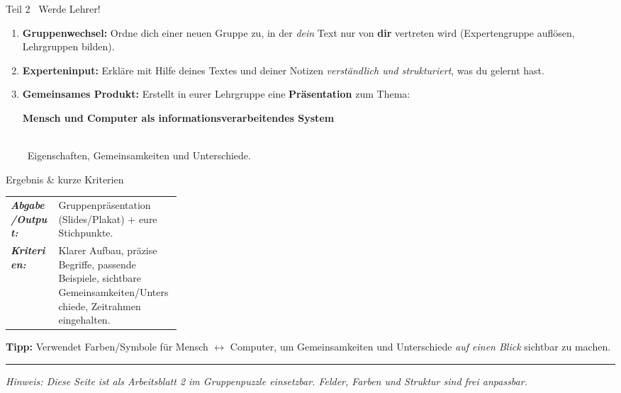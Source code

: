 \documentclass[11pt,a4paper]{scrartcl}
\newcommand{\blatttyp}{Arbeitsblatt 2}
\begin{document}
\begin{teilbox}{Teil 2 \textemdash\ Werde Lehrer!}
\begin{enumerate}[label=\roman*)]
  \item \textbf{Gruppenwechsel:} Ordne dich einer neuen Gruppe zu, in der \emph{dein} Text nur von \textbf{dir} vertreten wird (Expertengruppe auflösen, Lehrgruppen bilden).
  \item \textbf{Experteninput:} Erkläre mit Hilfe deines Textes und deiner Notizen \emph{verständlich und strukturiert}, was du gelernt hast. \\
  \item \textbf{Gemeinsames Produkt:} Erstellt in eurer Lehrgruppe eine \textbf{Präsentation} zum Thema:\\[2pt]
  \centerline{\textbf{Mensch und Computer als informationsverarbeitendes System}}\\ \textemdash\ Eigenschaften, Gemeinsamkeiten und Unterschiede.
\end{enumerate}
\end{teilbox}

\begin{infobox}{Ergebnis \& kurze Kriterien}
\begin{tabularx}{\linewidth}{@{}>{\bfseries}p{0.28\linewidth}X@{}}
\textit{Abgabe/Output:} & Gruppenpräsentation (Slides/Plakat) + eure Stichpunkte.\\
\textit{Kriterien:} & Klarer Aufbau, präzise Begriffe, passende Beispiele, sichtbare Gemeinsamkeiten/Unterschiede, Zeitrahmen eingehalten.\\
\end{tabularx}
\end{infobox}

\begin{hinweisbox}
\textbf{Tipp:} Verwendet Farben/Symbole für Mensch \(\leftrightarrow\) Computer, um Gemeinsamkeiten und Unterschiede \emph{auf einen Blick} sichtbar zu machen.
\end{hinweisbox}

\vfill
\hrule
\small\emph{Hinweis: Diese Seite ist als \blatttyp{} im Gruppenpuzzle einsetzbar. Felder, Farben und Struktur sind frei anpassbar.}
\end{document}
